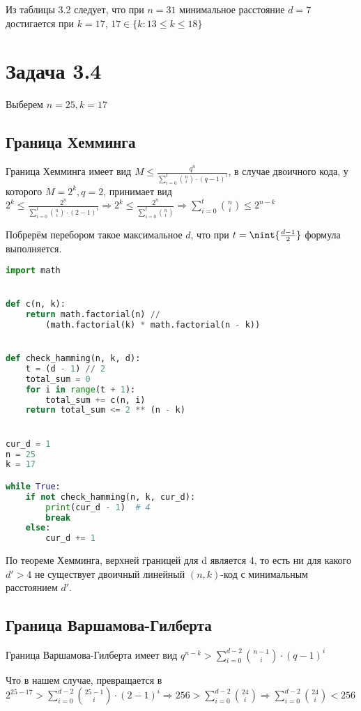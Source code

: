 \documentclass{article}
\DeclarePairedDelimiter{\nint}\lfloor\rfloor
\begin{document}
	 Из таблицы 3.2 следует, что при $n = 31$ минимальное расстояние $d = 7$ достигается при $k = 17$, $17 \in \{k: 13 \leq k \leq 18\}$
	 
	 \section{Задача 3.4}
	 
	 Выберем  $n = 25, k = 17$
	 
	 \subsection{Граница Хемминга}
	 
	 Граница Хемминга имеет вид $M \leq \frac{q^n}{\sum\limits_{i = 0}^t \binom{n}{i} \cdot (q - 1)^i}$, в случае двоичного кода, у которого $M = 2^k, q = 2$, принимает вид $2^k \leq \frac{2^n}{\sum\limits_{i = 0}^t \binom{n}{i} \cdot (2 - 1)^i} \Rightarrow 2^k \leq \frac{2^n}{\sum\limits_{i = 0}^t \binom{n}{i}} \Rightarrow \sum\limits_{i = 0}^t \binom{n}{i} \leq 2^{n - k}$
	 
	 Побрерём перебором такое максимальное $d$, что при $t = \nint{\frac{d - 1}{2}}$ формула выполняется.
	 
	 \begin{lstlisting}[language=python]
import math


def c(n, k):
	return math.factorial(n) // 
		(math.factorial(k) * math.factorial(n - k))


def check_hamming(n, k, d):
	t = (d - 1) // 2
	total_sum = 0
	for i in range(t + 1):
		total_sum += c(n, i)
	return total_sum <= 2 ** (n - k)


cur_d = 1
n = 25
k = 17

while True:
	if not check_hamming(n, k, cur_d):
		print(cur_d - 1)  # 4
		break
	else:
		cur_d += 1
	 \end{lstlisting}
	 
	 По теореме Хемминга, верхней границей для d является 4, то есть ни для какого $d' > 4$ не существует двоичный линейный $(n, k)$-код с минимальным расстоянием $d'$.
	 
	 \subsection{Граница Варшамова-Гилберта}
	 
	 Граница Варшамова-Гилберта имеет вид $q^{n - k} > \sum\limits_{i = 0}^{d - 2} \binom{n - 1}{i} \cdot (q - 1)^i$
	 
	 Что в нашем случае, превращается в $2^{25 - 17} > \sum\limits_{i = 0}^{d - 2} \binom{25 - 1}{i} \cdot (2 - 1)^i \Rightarrow  256 > \sum\limits_{i = 0}^{d - 2} \binom{24}{i} \Rightarrow \sum\limits_{i = 0}^{d - 2} \binom{24}{i} < 256$
	 
\end{document}
